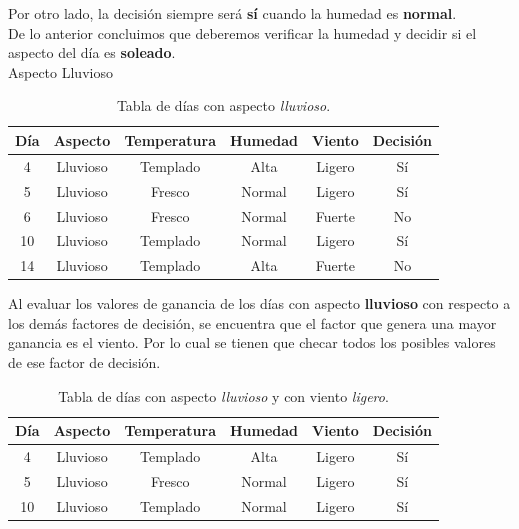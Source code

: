 \begin{UClist}
	Por otro lado, la decisión siempre será \textbf{sí} cuando la humedad es \textbf{normal}.\\

	De lo anterior concluimos que deberemos verificar la humedad y decidir si el aspecto del día es \textbf{soleado}.\\

	\UCli Aspecto Lluvioso\\
	\begin{table}[H]
		\begin{center}
			\label{tab:tablaInduccionAspectoLluvioso}
			\begin{tabular}{c|c|c|c|c|c}
				\textbf{Día} & \textbf{Aspecto} & \textbf{Temperatura} & \textbf{Humedad} & \textbf{Viento} & \textbf{Decisión}\\
				\hline
				4 & Lluvioso & Templado & Alta & Ligero & Sí\\
				5 & Lluvioso & Fresco & Normal & Ligero & Sí\\
				6 & Lluvioso & Fresco & Normal & Fuerte & No\\
				10 & Lluvioso & Templado & Normal & Ligero & Sí\\
				14 & Lluvioso & Templado & Alta & Fuerte & No\\
			\end{tabular}
		\end{center}
		\caption{Tabla de días con aspecto \emph{lluvioso}.}
	\end{table}

	Al evaluar los valores de ganancia de los días con aspecto \textbf{lluvioso} con respecto a los demás factores de decisión, se encuentra que el factor que genera una mayor ganancia es el viento. Por lo cual se tienen que checar todos los posibles valores de ese factor de decisión.\\

	\begin{table}[H]
		\begin{center}
			\label{tab:tablaInduccionAspectoLluviosoVientoLigero}
			\begin{tabular}{c|c|c|c|c|c}
				\textbf{Día} & \textbf{Aspecto} & \textbf{Temperatura} & \textbf{Humedad} & \textbf{Viento} & \textbf{Decisión}\\
				\hline
				4 & Lluvioso & Templado & Alta & Ligero & Sí\\
				5 & Lluvioso & Fresco & Normal & Ligero & Sí\\
				10 & Lluvioso & Templado & Normal & Ligero & Sí\\
			\end{tabular}
		\end{center}
		\caption{Tabla de días con aspecto \emph{lluvioso} y con viento \emph{ligero}.}
	\end{table}


\end{UClist}
